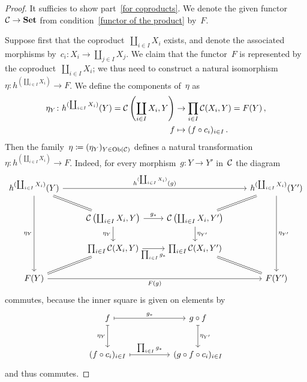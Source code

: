 \begin{proof}
  It sufficies to show part~\ref*{for coproducts}.
  We denote the given functor~$\mathcal{C} \to \mathbf{Set}$ from condition~\ref*{functor of the product} by~$F$.
  
  Suppose first that the coproduct~$\coprod_{i \in I} X_i$ exists, and denote the associated morphisms by~$c_i \colon X_i \to \coprod_{j \in I} X_j$.
  We claim that the functor~$F$ is represented by the coproduct~$\coprod_{i \in I} X_i$;
  we thus need to construct a natural isomorphism~$\eta \colon h^{(\coprod_{i \in I} X_i)} \to F$.
  We define the components of~$\eta$ as
  \begin{align*}
              \eta_Y
     \colon   h^{(\coprod_{i \in I} X_i)}(Y)
     =        \mathcal{C}\left( \coprod_{i \in I} X_i, Y \right)
    &\to      \prod_{i \in I} \mathcal{C}(X_i, Y)
     =        F(Y) \,,
     \\
              f
    &\mapsto  (f \circ c_i)_{i \in I} \,.
  \end{align*}
  Then the family~$\eta \coloneqq (\eta_Y)_{Y \in \operatorname{Ob}(\mathcal{C})}$ defines a natural transformation~$\eta \colon h^{(\coprod_{i \in I} X_i)} \to F$.
  Indeed, for every morphism~$g \colon Y \to Y'$ in~$\mathcal{C}$ the diagram
  \[
    \begin{tikzcd}
        h^{(\coprod_{i \in I} X_i)}(Y)
        \arrow{rrr}[above]{h^{(\coprod_{i \in I} X_i)}(g)}
        \arrow{ddd}[left]{\eta_Y}
        \arrow[equal]{dr}
      & {}
      & {}
      & h^{(\coprod_{i \in I} X_i)}(Y')
        \arrow{ddd}[right]{\eta_{Y'}}
        \arrow[equal]{dl}
      \\
        {}
      & \Ccat\left( \coprod_{i \in I} X_i, Y \right)
        \arrow{r}[above]{g_*}
        \arrow{d}[left]{\eta_Y}
      & \Ccat\left( \coprod_{i \in I} X_i, Y' \right)
        \arrow{d}[right]{\eta_{Y'}}
      & {}
      \\
        {}
      & \prod_{i \in I} \Ccat(X_i, Y)
        \arrow{r}[below]{\prod_{i \in I} g_*}
      & \prod_{i \in I} \Ccat(X_i, Y')
      & {}
      \\
        F(Y)
        \arrow[equal]{ur}
        \arrow{rrr}[below]{F(g)}
      & {}
      & {}
      & F(Y')
        \arrow[equal]{ul}
    \end{tikzcd}
  \]
  commutes, because the inner square is given on elements by
  \[
    \begin{tikzcd}[column sep = huge, row sep = large]
        f
        \arrow[maps to]{r}[above]{g_*}
        \arrow[maps to]{d}[left]{\eta_Y}
      & g \circ f
        \arrow[maps to]{d}[right]{\eta_{Y'}}
      \\
        (f \circ c_i)_{i \in I}
        \arrow[maps to]{r}[above]{\prod_{i \in I} g_*}
      & (g \circ f \circ c_i)_{i \in I}
    \end{tikzcd}
  \]
  and thus commutes.
  

\end{proof}
